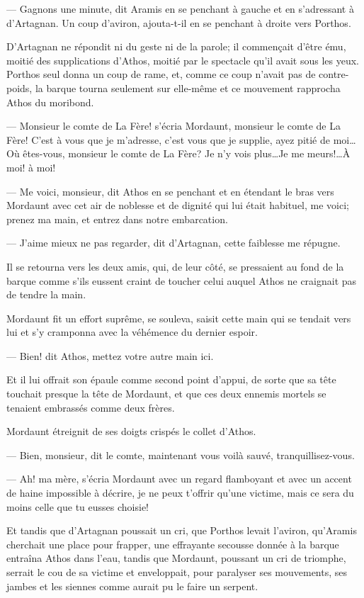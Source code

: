 — Gagnons une minute, dit Aramis en se penchant à gauche et en s'adressant à d'Artagnan. Un coup d'aviron, ajouta-t-il en se penchant à droite vers Porthos.

D'Artagnan ne répondit ni du geste ni de la parole; il commençait d'être ému, moitié des supplications d'Athos, moitié par le spectacle qu'il avait sous les yeux. Porthos seul donna un coup de rame, et, comme ce coup n'avait pas de contre-poids, la barque tourna seulement sur elle-même et ce mouvement rapprocha Athos du moribond.

— Monsieur le comte de La Fère! s'écria Mordaunt, monsieur le comte de La Fère! C'est à vous que je m'adresse, c'est vous que je supplie, ayez pitié de moi\dots Où êtes-vous, monsieur le comte de La Fère? Je n'y vois plus\dots Je me meurs!\dots À moi! à moi!

— Me voici, monsieur, dit Athos en se penchant et en étendant le bras vers Mordaunt avec cet air de noblesse et de dignité qui lui était habituel, me voici; prenez ma main, et entrez dans notre embarcation.

— J'aime mieux ne pas regarder, dit d'Artagnan, cette faiblesse me répugne.

Il se retourna vers les deux amis, qui, de leur côté, se pressaient au fond de la barque comme s'ils eussent craint de toucher celui auquel Athos ne craignait pas de tendre la main.

Mordaunt fit un effort suprême, se souleva, saisit cette main qui se tendait vers lui et s'y cramponna avec la véhémence du dernier espoir.

— Bien! dit Athos, mettez votre autre main ici.

Et il lui offrait son épaule comme second point d'appui, de sorte que sa tête touchait presque la tête de Mordaunt, et que ces deux ennemis mortels se tenaient embrassés comme deux frères.

Mordaunt étreignit de ses doigts crispés le collet d'Athos.

— Bien, monsieur, dit le comte, maintenant vous voilà sauvé, tranquillisez-vous.

— Ah! ma mère, s'écria Mordaunt avec un regard flamboyant et avec un accent de haine impossible à décrire, je ne peux t'offrir qu'une victime, mais ce sera du moins celle que tu eusses choisie!

Et tandis que d'Artagnan poussait un cri, que Porthos levait l'aviron, qu'Aramis cherchait une place pour frapper, une effrayante secousse donnée à la barque entraîna Athos dans l'eau, tandis que Mordaunt, poussant un cri de triomphe, serrait le cou de sa victime et enveloppait, pour paralyser ses mouvements, ses jambes et les siennes comme aurait pu le faire un serpent.

